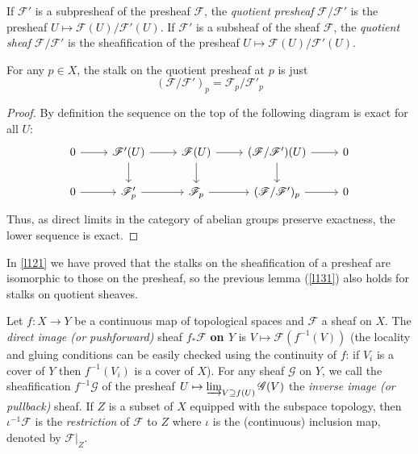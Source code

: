 \documentclass[12pt,letter]{article}
\begin{document}
	If $\mathscr F'$ is a subpresheaf of the presheaf $\mathscr F$, the \textit{quotient presheaf} $\mathscr F/\mathscr F'$ is the presheaf $U\mapsto\mathscr F(U)/\mathscr F'(U)$. If $\mathscr F'$ is a subsheaf of the sheaf $\mathscr F$, the \textit{quotient sheaf} $\mathscr F/\mathscr F'$ is the sheafification of the presheaf $U\mapsto\mathscr F(U)/\mathscr F'(U)$.
	\begin{lemma}\label{l131}
	For any $p\in X$, the stalk on the quotient presheaf at $p$ is just
	\[(\mathscr F/\mathscr F')_p=\mathscr F_p/\mathscr F'_p\]
	\end{lemma}
	\begin{proof}
	By definition the sequence on the top of the following diagram is exact for all $U$:
	\[
	\begin{tikzcd}
0 \arrow[r] & \mathscr F'(U) \arrow[r] \arrow[d] & \mathscr F(U) \arrow[r] \arrow[d] & (\mathscr F/\mathscr F')(U) \arrow[r] \arrow[d] & 0 \\
0 \arrow[r] & \mathscr F_p' \arrow[r]            & \mathscr F_p \arrow[r]            & (\mathscr F/\mathscr F')_p \arrow[r]            & 0
\end{tikzcd}
	\]
	Thus, as direct limits in the category of abelian groups preserve exactness, the lower sequence is exact.
	\end{proof}
	In \autoref{l121} we have proved that the stalks on the sheafification of a presheaf are isomorphic to those on the presheaf, so the previous lemma (\autoref{l131}) also holds for  stalks on quotient sheaves.
	
	Let $f:X\to Y$ be a continuous map of topological spaces and $\mathscr F$ a sheaf on $X$. The \textit{direct image (or pushforward)} sheaf $f_*\mathscr F$ \textbf{on $Y$} is $V\mapsto \mathscr F(f^{-1}(V))$ (the locality and gluing conditions can be easily checked using the continuity of $f$: if $V_i$ is a cover of $Y$ then $f^{-1}(V_i)$ is a cover of $X$). For any sheaf $\mathscr G$ on $Y$, we call the sheafification $f^{-1}\mathscr G$ of the presheaf $U\mapsto \varinjlim_{V\supseteq f(U)}\mathscr G(V)$ the \textit{inverse image (or pullback)} sheaf. If $Z$ is a subset of $X$ equipped with the subspace topology, then $\iota^{-1}\mathscr F$ is the \textit{restriction} of $\mathscr F$ to $Z$ where $\iota$ is the (continuous) inclusion map, denoted by $\mathscr F|_Z$.
	
\end{document}
